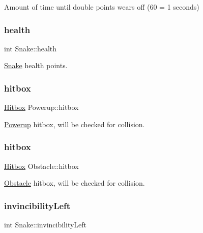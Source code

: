 Amount of time until double points wears off (60 = 1 seconds) 

\mbox{\label{group__snake_ga9579d3c93826054b42af664d0a4919d6}} 
\subsubsection{\texorpdfstring{health}{health}}
{\footnotesize\ttfamily int Snake\+::health}



\mbox{\hyperlink{struct_snake}{Snake}} health points. 

\mbox{\label{group__snake_ga0ec1e0954c1802c16b49ff5833146f32}} 
\subsubsection{\texorpdfstring{hitbox}{hitbox}\hspace{0.1cm}{\footnotesize\ttfamily [1/2]}}
{\footnotesize\ttfamily \mbox{\hyperlink{struct_hitbox}{Hitbox}} Powerup\+::hitbox}



\mbox{\hyperlink{struct_powerup}{Powerup}} hitbox, will be checked for collision. 

\mbox{\label{group__snake_ga7db468fea7e79f8f801944afbea0501e}} 
\subsubsection{\texorpdfstring{hitbox}{hitbox}\hspace{0.1cm}{\footnotesize\ttfamily [2/2]}}
{\footnotesize\ttfamily \mbox{\hyperlink{struct_hitbox}{Hitbox}} Obstacle\+::hitbox}



\mbox{\hyperlink{struct_obstacle}{Obstacle}} hitbox, will be checked for collision. 

\mbox{\label{group__snake_gae942bd8af663886b8e1c4274062174b5}} 
\subsubsection{\texorpdfstring{invincibility\+Left}{invincibilityLeft}}
{\footnotesize\ttfamily int Snake\+::invincibility\+Left}



